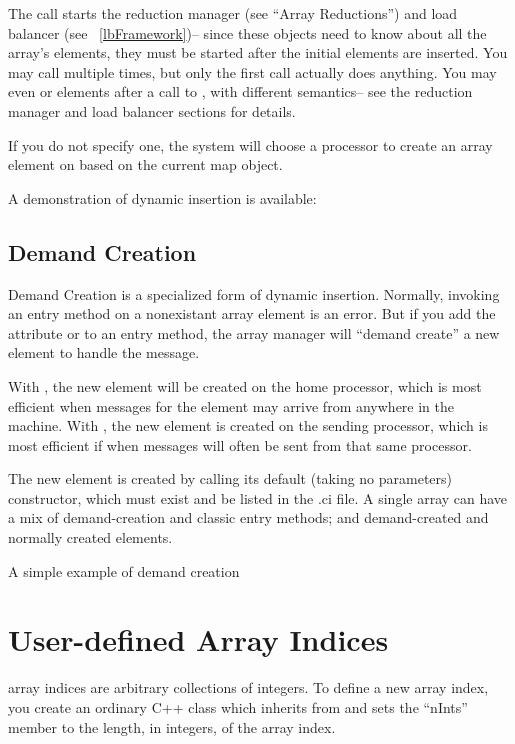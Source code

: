 The  call starts the reduction manager (see ``Array
Reductions'') and load balancer (see ~\ref{lbFramework})-- since
these objects need to know about all the array's elements, they
must be started after the initial elements are inserted.
You may call  multiple times, but only the first
call actually does anything.  You may even  or 
elements after a call to , with different semantics-- 
see the reduction manager and load balancer sections for details.

If you do not specify one, the system will choose a processor to 
create an array element on based on the current map object.

A demonstration of dynamic insertion is available:

\subsection{Demand Creation}

Demand Creation is a specialized form of dynamic insertion. Normally, invoking an entry method on a nonexistant array
element is an error.  But if you add the attribute
 
\kw{[createhere]} or \kw{[createhome]} to an entry method,
 the array manager will 
``demand create'' a new element to handle the message. 

With \kw{[createhome]}, the new element
will be created on the home processor, which is most efficient when messages for
the element may arrive from anywhere in the machine. With \kw{[createhere]},
the new element is created on the sending processor, which is most efficient
if when messages will often be sent from that same processor.

The new element is created by calling its default (taking no
parameters) constructor, which must exist and be listed in the .ci file.
A single array can have a mix of demand-creation and
classic entry methods; and demand-created and normally 
created elements. 

A simple example of demand creation

\section{User-defined Array Indices}
\label{user-defined array index type}

\charmpp{} array indices are arbitrary collections of integers.
To define a new array index, you create an ordinary C++ class 
which inherits from  and sets the ``nInts'' member
to the length, in integers, of the array index.

